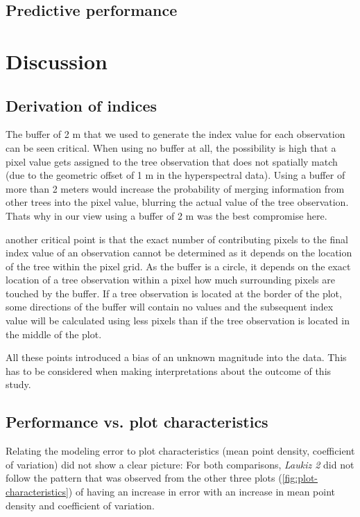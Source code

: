 \documentclass[review]{elsarticle}
\begin{document}
\subsection{Predictive performance}

\section{Discussion}

\subsection{Derivation of indices}

\noindent The buffer of 2 m that we used to generate the index value for each observation can be seen critical.
When using no buffer at all, the possibility is high that a pixel value gets assigned to the tree observation that does not spatially match (due to the geometric offset of 1 m in the hyperspectral data).
Using a buffer of more than 2 meters would increase the probability of merging information from other trees into the pixel value, blurring the actual value of the tree observation.
Thats why in our view using a buffer of 2 m was the best compromise here.

another critical point is that the exact number of contributing pixels to the final index value of an observation cannot be determined as it depends on the location of the tree within the pixel grid.
As the buffer is a circle, it depends on the exact location of a tree observation within a pixel how much surrounding pixels are touched by the buffer.
If a tree observation is located at the border of the plot, some directions of the buffer will contain no values and the subsequent index value will be calculated using less pixels than if the tree observation is located in the middle of the plot.

All these points introduced a bias of an unknown magnitude into the data.
This has to be considered when making interpretations about the outcome of this study.

\subsection{Performance vs. plot characteristics}

\noindent Relating the modeling error to plot characteristics (mean point density, coefficient of variation) did not show a clear picture: For both comparisons, \textit{Laukiz 2} did not follow the pattern that was observed from the other three plots (\autoref{fig:plot-characteristics}) of having an increase in error with an increase in mean point density and coefficient of variation.
\end{document}
